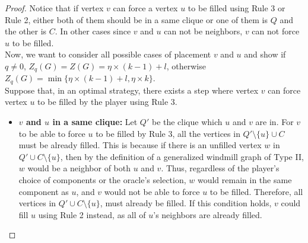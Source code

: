 \documentclass[11pt]{article}
\theoremstyle{plain}
\theoremstyle{definition}
\theoremstyle{remark}
\begin{document}
\begin{proof}
    Notice that if vertex $v$ can force a vertex $u$ to be filled using Rule 3 or Rule 2, either both of them should be in a same clique or one of them is $Q$ and the other is $C$. In other cases since $v$ and $u$ can not be neighbors, $v$ can not force $u$ to be filled.
    \\
    Now, we want to consider all possible cases of placement $v$ and $u$ and show if $q \neq 0$, $Z_q(G) = Z(G) = \eta \times (k-1) + l$, otherwise $Z_q(G) = \min \{\eta \times (k-1) + l , \eta \times k\}$. \\

    Suppose that, in an optimal strategy, there exists a step where vertex $ v $ can force vertex $ u $ to be filled by the player using Rule 3.

    \begin{itemize}
        \item \textbf{$v$ and $u$ in a same clique:} Let $Q'$ be the clique which $u$ and $v$ are in. For $v$ to be able to force $u$ to be filled by Rule 3, all the vertices in $Q' \setminus \{u\} \cup C$ must be already filled. This is because if there is an unfilled vertex $ w $ in $ Q' \cup C  \setminus \{u\}$, then by the definition of a generalized windmill graph of Type II, $ w $ would be a neighbor of both $ u $ and $ v $. Thus, regardless of the player’s choice of components or the oracle’s selection, $ w $ would remain in the same component as $ u $, and $ v $ would not be able to force $ u $ to be filled. Therefore, all vertices in $ Q' \cup C \setminus \{u\} $, must already be filled. If this condition holds, $ v $ could fill $ u $ using Rule 2 instead, as all of $u$’s neighbors are already filled.


\end{itemize}
\end{proof}
\end{document}
